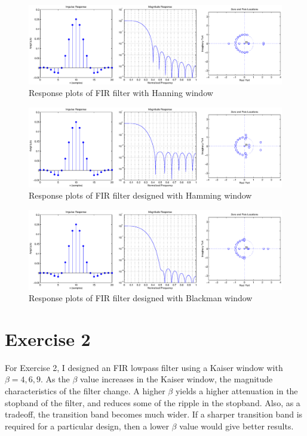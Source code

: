 \documentclass{article}
\begin{document}
\begin{figure}[htbp]
\centering
\includegraphics[width=6in]{project7_03.eps}
\caption{Response plots of FIR filter with Hanning window}
\label{fig:figure3}
\end{figure}

\begin{figure}[htbp]
\centering
\includegraphics[width=6in]{project7_04.eps}
\caption{Response plots of FIR filter designed with Hamming window}
\label{fig:figure4}
\end{figure}

\begin{figure}[htbp]
\centering
\includegraphics[width=6in]{project7_05.eps}
\caption{Response plots of FIR filter designed with Blackman window}
\label{fig:figure5}
\end{figure}

\newpage
\section*{Exercise 2}
\begin{par}
For Exercise 2, I designed an FIR lowpass filter using a Kaiser window with $\beta = 4, 6, 9$.  As the $\beta$ value increases in the Kaiser window, the magnitude characteristics of the filter change.  A higher $\beta$ yields a higher attenuation in the stopband of the filter, and reduces some of the ripple in the stopband.  Also, as a tradeoff, the transition band becomes much wider.  If a sharper transition band is required for a particular design, then a lower $\beta$ value would give better results.
\end{par}
\end{document}
